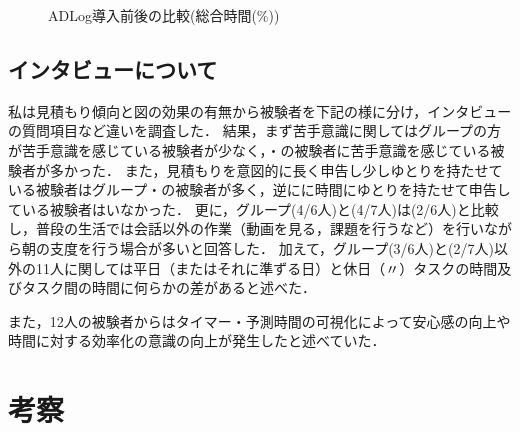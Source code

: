 \begin{figure}[hb]
	\begin{center}
		\caption{ADLog導入前後の比較(総合時間(\%))}
		\label{fig:14}
	\end{center}
\end{figure}


\subsection{インタビューについて}
私は見積もり傾向と図の効果の有無から被験者を下記の様に分け，インタビューの質問項目など違いを調査した．
結果，まず苦手意識に関してはグループの方が苦手意識を感じている被験者が少なく，・の被験者に苦手意識を感じている被験者が多かった．
また，見積もりを意図的に長く申告し少しゆとりを持たせている被験者はグループ・の被験者が多く，逆にに時間にゆとりを持たせて申告している被験者はいなかった．
更に，グループ(4/6人)と(4/7人)は(2/6人)と比較し，普段の生活では会話以外の作業（動画を見る，課題を行うなど）を行いながら朝の支度を行う場合が多いと回答した．
加えて，グループ(3/6人)と(2/7人)以外の11人に関しては平日（またはそれに準ずる日）と休日（〃）タスクの時間及びタスク間の時間に何らかの差があると述べた．

また，12人の被験者からはタイマー・予測時間の可視化によって安心感の向上や時間に対する効率化の意識の向上が発生したと述べていた．
\section{考察}
